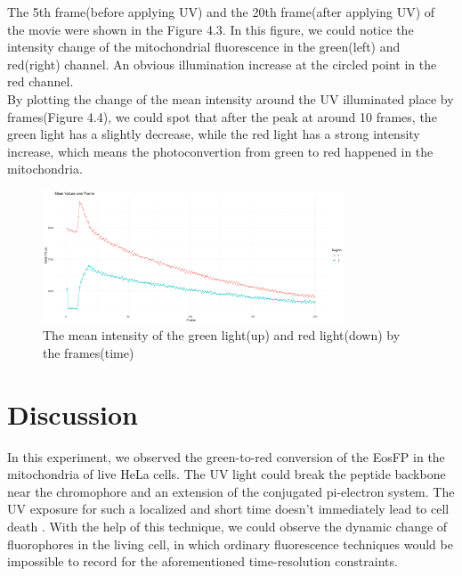 \documentclass[a4paper,english,12pt,bibliography=totoc]{scrreprt}
\begin{document}
The 5th frame(before applying UV) and the 20th frame(after applying UV) of the movie were shown in the Figure 4.3. In this figure, we could notice the intensity change of the mitochondrial fluorescence in the green(left) and red(right) channel. An obvious illumination increase at the circled point in the red channel. \\

By plotting the change of the mean intensity around the UV illuminated place by frames(Figure 4.4), we could spot that after the peak at around 10 frames, the green light has a slightly decrease, while the red light has a strong intensity increase, which means the photoconvertion from green to red happened in the mitochondria.


\begin{figure}[H]
    \centering
    \includegraphics[width = 0.8\textwidth]{Images/Green_to_red/Intensity_Plot_DataEosFP-Mitochondria_dualCh_473nm+532nm.png}
    \caption{The mean intensity of the green light(up) and red light(down) by the frames(time)}
    \label{fig:enter-label}
\end{figure}


\section{Discussion}
In this experiment, we observed the green-to-red conversion of the EosFP in the mitochondria of live HeLa cells. The UV light could break the peptide backbone near the chromophore and an extension of the conjugated pi-electron system.\cite{EosFP} The UV exposure for such a localized and short time doesn't immediately lead to cell death \cite{UV_light}. With the help of this technique, we could observe the dynamic change of fluorophores in the living cell, in which ordinary fluorescence techniques would be impossible to record for the aforementioned time-resolution constraints.\\
\end{document}
